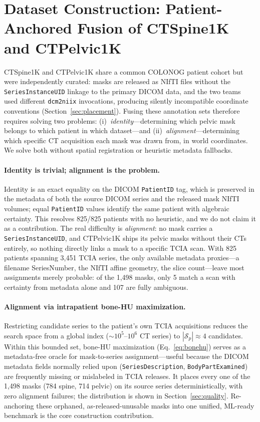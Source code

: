 \documentclass[pmlr]{jmlr}
\begin{document}
\section{Dataset Construction: Patient-Anchored Fusion of CTSpine1K
and CTPelvic1K}
\label{sec:generalizable}

CTSpine1K and CTPelvic1K share a common COLONOG patient cohort but
were independently curated: masks are released as NIfTI files
without the \texttt{SeriesInstanceUID} linkage to the primary DICOM
data, and the two teams used different \texttt{dcm2niix}
invocations, producing silently incompatible coordinate conventions
(Section~\ref{sec:placement}).
Fusing these annotation sets therefore requires solving two
problems: (i)~\emph{identity}---determining which pelvic mask
belongs to which patient in which dataset---and
(ii)~\emph{alignment}---determining which specific CT acquisition
each mask was drawn from, in world coordinates.
We solve both without spatial registration or heuristic metadata
fallbacks.

\paragraph{Identity is trivial; alignment is the problem.}
Identity is an exact equality on the DICOM \texttt{PatientID} tag,
which is preserved in the metadata of both the source DICOM series
and the released mask NIfTI volumes; equal \texttt{PatientID} values
identify the same patient with algebraic certainty. This resolves
825/825 patients with no heuristic, and we do not claim it as a
contribution. The real difficulty is \emph{alignment}: no mask
carries a \texttt{SeriesInstanceUID}, and CTPelvic1K ships its
pelvic masks without their CTs entirely, so nothing directly links a
mask to a specific TCIA scan. With 825 patients spanning 3{,}451
TCIA series, the only available metadata proxies---a filename
SeriesNumber, the NIfTI affine geometry, the slice count---leave
most assignments merely probable: of the 1{,}498 masks, only 5
match a scan with certainty from metadata alone and 107 are fully
ambiguous.

\paragraph{Alignment via intrapatient bone-HU maximization.}
Restricting candidate series to the patient's own TCIA acquisitions
reduces the search space from a global index
($\sim$$10^5$--$10^6$ CT series) to
$|\mathcal{S}_p| \approx 4$ candidates. Within this bounded set,
bone-HU maximization (Eq.~\ref{eq:bonehu}) serves as a
metadata-free oracle for mask-to-series assignment---useful because
the DICOM metadata fields normally relied upon
(\texttt{SeriesDescription}, \texttt{BodyPartExamined}) are
frequently missing or mislabeled in TCIA releases.
It places every one of the 1{,}498 masks (784 spine, 714 pelvic) on
its source series deterministically, with zero alignment failures;
the distribution is shown in Section~\ref{sec:quality}.
Re-anchoring these orphaned, as-released-unusable masks into one
unified, ML-ready benchmark is the core construction contribution.
\end{document}
